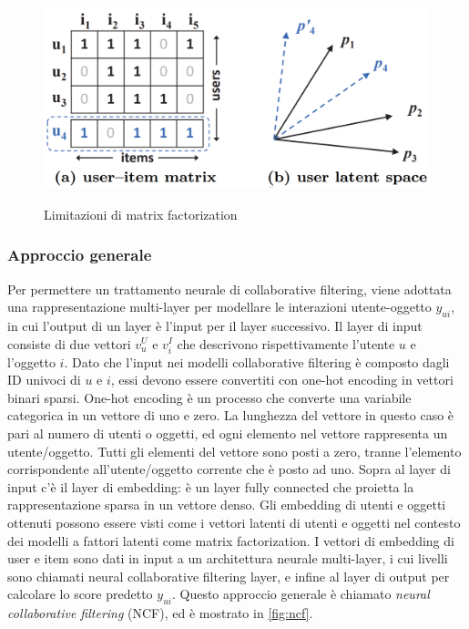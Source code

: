 \documentclass[12pt,italian]{report}
\begin{document}
\begin{figure}
  \centering
  \includegraphics[scale=0.50]{immagini/user_item_vectors.png}
  \caption{Limitazioni di matrix factorization}
  \cite{NCF}
  \label{fig:mf-limits}
\end{figure}

\subsubsection{Approccio generale}
Per permettere un trattamento neurale di collaborative filtering, viene adottata una rappresentazione multi-layer per modellare le interazioni utente-oggetto $y_{ui}$, in cui l'output di un layer è l'input per il layer successivo. Il layer di input consiste di due vettori $v_u^U$ e $v_i^I$ che descrivono rispettivamente l'utente $u$ e l'oggetto $i$. Dato che l'input nei modelli collaborative filtering è composto dagli ID univoci di $u$ e $i$, essi devono essere convertiti con one-hot encoding in vettori binari sparsi. One-hot encoding è un processo che converte una variabile categorica in un vettore di uno e zero. La lunghezza del vettore in questo caso è pari al numero di utenti o oggetti, ed ogni elemento nel vettore rappresenta un utente/oggetto. Tutti gli elementi del vettore sono posti a zero, tranne l'elemento corrispondente all'utente/oggetto corrente che è posto ad uno. Sopra al layer di input c'è il layer di embedding: è un layer fully connected che proietta la rappresentazione sparsa in un vettore denso. Gli embedding di utenti e oggetti ottenuti possono essere visti come i vettori latenti di utenti e oggetti nel contesto dei modelli a fattori latenti come matrix factorization. I vettori di embedding di user e item sono dati in input a un architettura neurale multi-layer, i cui livelli sono chiamati neural collaborative filtering layer, e infine al layer di output per calcolare lo score predetto $y_{ui}$. Questo approccio generale è chiamato \textit{neural collaborative filtering} (NCF), ed è mostrato in \autoref{fig:ncf}.
\end{document}
